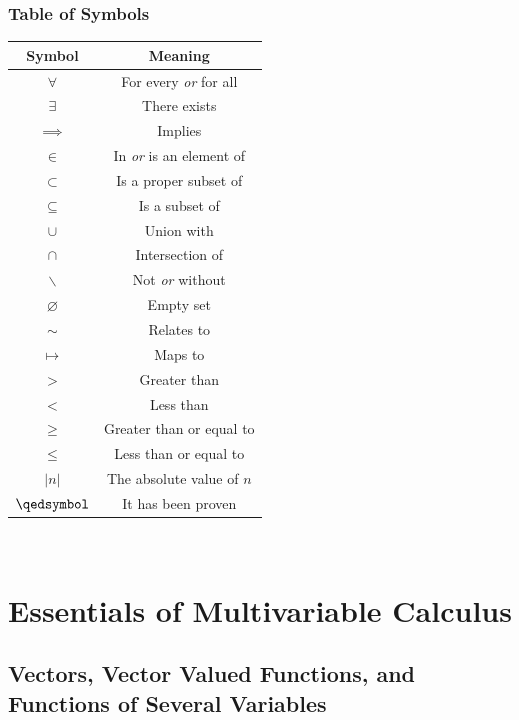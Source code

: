 \documentclass[10pt]{book}
\begin{document}
\section{Table of Symbols}
\begin{center}
  \begin{tabular}{cc}
    \toprule
    Symbol          & Meaning                       \\
    \midrule
    $\forall$       & For every \emph{or} for all   \\
    $\exists$       & There exists                  \\
    $\implies$      & Implies                       \\
    $ \in $         & In \emph{or} is an element of \\
    $ \subset $     & Is a proper subset of         \\
    $ \subseteq $   & Is a subset of                \\
    $ \cup $        & Union with                    \\
    $ \cap $        & Intersection of               \\
    $ \backslash$   & Not \emph{or} without         \\
    $ \varnothing $ & Empty set                     \\
    $ \sim  $       & Relates to                    \\
    $\mapsto$       & Maps to                       \\
    $ > $           & Greater than                  \\
    $ < $           & Less than                     \\
    $ \ge $         & Greater than or equal to      \\
    $ \le $         & Less than or equal to         \\
    $|n|$           & The absolute value of $n$     \\
    $\qedsymbol $   & It has been proven            \\

    \bottomrule
  \end{tabular}
\end{center}
\mainmatter\

\part{Essentials of Multivariable Calculus}
\chapter{Vectors, Vector Valued Functions, and Functions of Several Variables}
\end{document}
